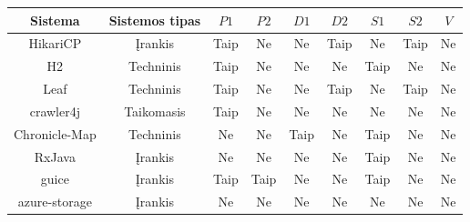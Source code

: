 \begin{figure}[H]
    \begin{center}
        \begin{tabular}{|c|c|c|c|c|c|c|c|c|}
            \hline
            Sistema                         & Sistemos tipas & $ P1 $ & $ P2 $ & $ D1 $ & $ D2 $ & $ S1 $ & $ S2 $ & $ V $ \\ \hline\hline
            HikariCP                        & Įrankis                   & Taip                          & Ne                            & Ne                         & Taip                       & Ne                 & Taip               & Ne                  \\ \hline
            H2                              & Techninis                 & Taip                          & Ne                            & Ne                         & Ne                         & Taip               & Ne                 & Ne                  \\ \hline
            Leaf                            & Techninis                 & Taip                          & Ne                            & Ne                         & Taip                       & Ne                 & Taip               & Ne                  \\ \hline
            crawler4j                       & Taikomasis                & Taip                          & Ne                            & Ne                         & Ne                         & Ne                 & Ne                 & Ne                  \\ \hline
            Chronicle-Map                   & Techninis                 & Ne                            & Ne                            & Taip                       & Ne                         & Taip               & Ne                 & Ne                  \\ \hline
            RxJava                          & Įrankis                   & Ne                            & Ne                            & Ne                         & Ne                         & Taip               & Ne                 & Ne                  \\ \hline
            guice                           & Įrankis                   & Taip                          & Taip                          & Ne                         & Ne                         & Taip               & Ne                 & Ne                  \\ \hline
            azure-storage                   & Įrankis                   & Ne                            & Ne                            & Ne                         & Ne                         & Ne                 & Ne                 & Ne                  \\ \hline

\end{tabular}
\end{center}
\end{figure}
